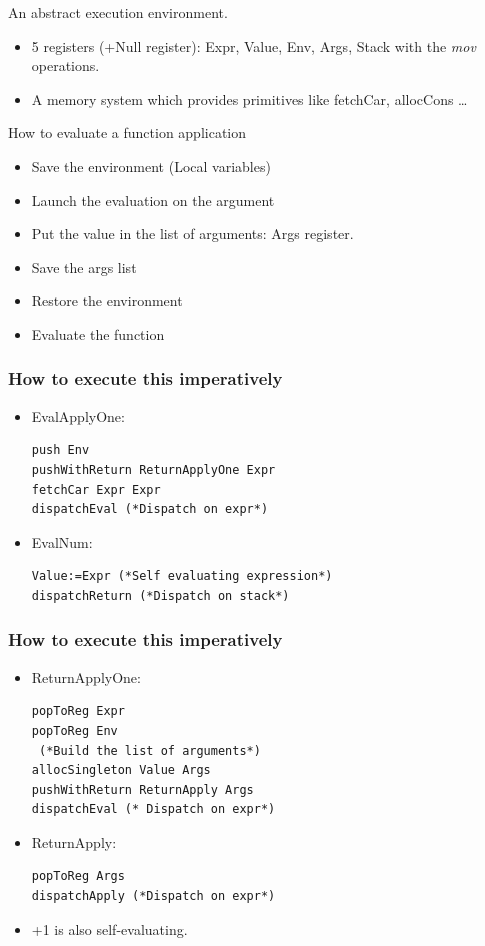 \documentclass{beamer}
\begin{document}
\begin{frame}{An abstract execution environment.}
\begin{itemize}
\item 5 registers (+Null register): Expr, Value, Env, Args, Stack with the
\emph{mov}
operations.
\item A memory system which provides primitives like fetchCar, allocCons \dots 
\end{itemize}
\end{frame}


\begin{frame}{How to evaluate a function application}
\begin{itemize}
\item Save the environment (Local variables)
\item Launch the evaluation on the argument
\item Put the value in the list of arguments: Args register.
\item Save the args list
\item Restore the environment
\item Evaluate the function
\end{itemize}
\end{frame}

\begin{frame}[fragile]
\frametitle{How to execute this imperatively}
\begin{itemize}
\item EvalApplyOne:
\begin{lstlisting}
push Env 
pushWithReturn ReturnApplyOne Expr
fetchCar Expr Expr
dispatchEval (*Dispatch on expr*) 
\end{lstlisting}
\item EvalNum:
\begin{lstlisting}
Value:=Expr (*Self evaluating expression*)
dispatchReturn (*Dispatch on stack*)
\end{lstlisting}
\end{itemize}
\end{frame}

\begin{frame}[fragile]
\frametitle{How to execute this imperatively}
\begin{itemize}
\item ReturnApplyOne:
\begin{lstlisting}
popToReg Expr
popToReg Env
 (*Build the list of arguments*) 
allocSingleton Value Args
pushWithReturn ReturnApply Args 
dispatchEval (* Dispatch on expr*)
\end{lstlisting}
\item ReturnApply:
\begin{lstlisting}
popToReg Args
dispatchApply (*Dispatch on expr*)
\end{lstlisting}
\item +1 is also self-evaluating.
\end{itemize}
\end{frame}
\end{document}
